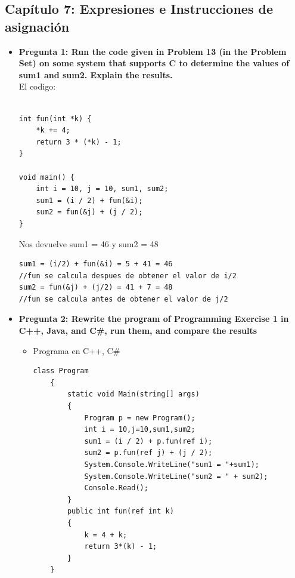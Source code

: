 \documentclass[12pt,oneside]{article}
\begin{document}
		\subsection{Capítulo 7: Expresiones e Instrucciones de asignación}	
			\begin{itemize}
				\item {\bf Pregunta 1: Run the code given in Problem 13 (in the Problem Set) on some system that supports C to determine the values of sum1 and sum2. Explain the results.}
					\\El codigo:
					\lstset{language=C,basicstyle=\small\sffamily,numbers=left,numberstyle=\tiny,frame=tb,columns=fullflexible,showstringspaces=false}
					\begin{lstlisting}[frame=single]  % Start your code-block

int fun(int *k) {
	*k += 4;
	return 3 * (*k) - 1;
}

void main() {
	int i = 10, j = 10, sum1, sum2;
	sum1 = (i / 2) + fun(&i);
	sum2 = fun(&j) + (j / 2);
}
					\end{lstlisting}
					Nos devuelve sum1 = 46 y sum2 = 48
\begin{lstlisting}[frame=single]
sum1 = (i/2) + fun(&i) = 5 + 41 = 46  
//fun se calcula despues de obtener el valor de i/2
sum2 = fun(&j) + (j/2) = 41 + 7 = 48  
//fun se calcula antes de obtener el valor de j/2
\end{lstlisting}
					
				\item {\bf Pregunta 2: Rewrite the program of Programming Exercise 1 in C++, Java, and C\#, run them, and compare the results}
					\begin{itemize}
						\item {Programa en C++, C\#}
							\begin{lstlisting}[frame = single] 
class Program
    {
        static void Main(string[] args)
        {
            Program p = new Program();
            int i = 10,j=10,sum1,sum2;
            sum1 = (i / 2) + p.fun(ref i);
            sum2 = p.fun(ref j) + (j / 2);
            System.Console.WriteLine("sum1 = "+sum1);
            System.Console.WriteLine("sum2 = " + sum2);
            Console.Read();
        }
        public int fun(ref int k)
        {
            k = 4 + k;
            return 3*(k) - 1;
        }
    }


\end{lstlisting}
\end{itemize}
\end{itemize}
\end{document}
